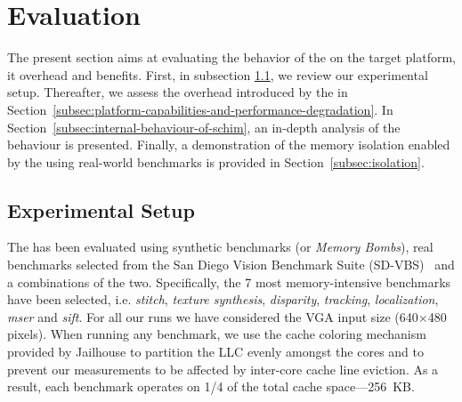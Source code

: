 \section{Evaluation}

The present section aims at evaluating the behavior of the \schim on
the target platform, it overhead and benefits.  First, in subsection
\ref{subsection:considered-architecture}, we review our experimental
setup. Thereafter, we assess the overhead introduced by the \schim in
Section~\ref{subsec:platform-capabilities-and-performance-degradation}. In
Section~\ref{subsec:internal-behaviour-of-schim}, an in-depth analysis
of the \schim behaviour is presented. Finally, a demonstration of the
memory isolation enabled by the \schim using real-world benchmarks is
provided in Section~\ref{subsec:isolation}.


\subsection{Experimental Setup}
\label{subsection:considered-architecture}
The \schim has been evaluated using synthetic benchmarks (or
\emph{Memory Bombs}), real benchmarks selected from the San Diego
Vision Benchmark Suite (SD-VBS)~\cite{SD-VBS} and a combinations of
the two. Specifically, the 7 most memory-intensive benchmarks have
been selected, i.e. \emph{stitch}, \emph{texture synthesis},
\emph{disparity}, \emph{tracking}, \emph{localization}, \emph{mser}
and \emph{sift}. For all our runs we have considered the VGA input
size (640$\times$480 pixels). When running any benchmark, we use the
cache coloring mechanism provided by Jailhouse to partition the LLC
evenly amongst the cores and to prevent our measurements to be
affected by inter-core cache line eviction. As a result, each
benchmark operates on 1/4 of the total cache space---256~KB.


